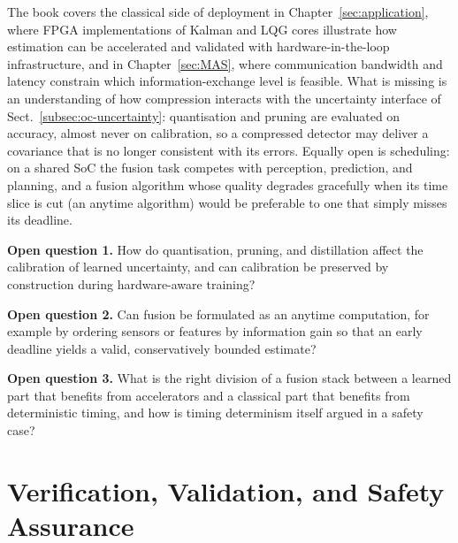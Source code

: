 The book covers the classical side of deployment in Chapter~\ref{sec:application}, where FPGA implementations of Kalman and LQG cores illustrate how estimation can be accelerated and validated with hardware-in-the-loop infrastructure, and in Chapter~\ref{sec:MAS}, where communication bandwidth and latency constrain which information-exchange level is feasible. What is missing is an understanding of how compression interacts with the uncertainty interface of Sect.~\ref{subsec:oc-uncertainty}: quantisation and pruning are evaluated on accuracy, almost never on calibration, so a compressed detector may deliver a covariance that is no longer consistent with its errors. Equally open is scheduling: on a shared SoC the fusion task competes with perception, prediction, and planning, and a fusion algorithm whose quality degrades gracefully when its time slice is cut (an anytime algorithm) would be preferable to one that simply misses its deadline.

\begin{list4a}
    \item \textbf{Open question 1.} How do quantisation, pruning, and distillation affect the calibration of learned uncertainty, and can calibration be preserved by construction during hardware-aware training?
    \item \textbf{Open question 2.} Can fusion be formulated as an anytime computation, for example by ordering sensors or features by information gain so that an early deadline yields a valid, conservatively bounded estimate?
    \item \textbf{Open question 3.} What is the right division of a fusion stack between a learned part that benefits from accelerators and a classical part that benefits from deterministic timing, and how is timing determinism itself argued in a safety case?
\end{list4a}

\section{Verification, Validation, and Safety Assurance}
\label{subsec:oc-vv}

